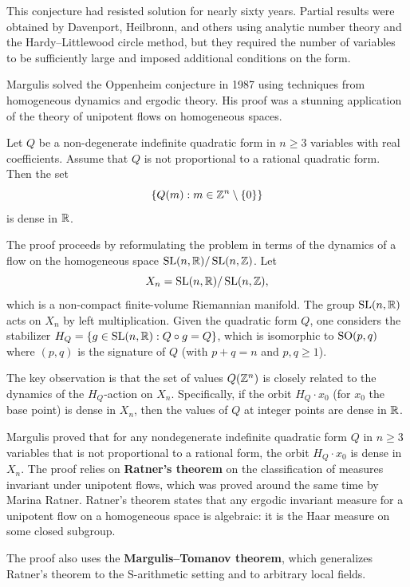 This conjecture had resisted solution for nearly sixty years. Partial results were obtained by Davenport, Heilbronn, and others using analytic number theory and the Hardy--Littlewood circle method, but they required the number of variables to be sufficiently large and imposed additional conditions on the form.

Margulis solved the Oppenheim conjecture in 1987 using techniques from homogeneous dynamics and ergodic theory. His proof was a stunning application of the theory of unipotent flows on homogeneous spaces.

\begin{theorem}
Let \(Q\) be a non-degenerate indefinite quadratic form in \(n \geq 3\) variables with real coefficients. Assume that \(Q\) is not proportional to a rational quadratic form. Then the set
\[
\{Q(m) : m \in \mathbb{Z}^n \setminus \{0\}\}
\]
is dense in \(\mathbb{R}\).
\end{theorem}

The proof proceeds by reformulating the problem in terms of the dynamics of a flow on the homogeneous space \(\operatorname{SL}(n,\mathbb{R})/\operatorname{SL}(n,\mathbb{Z})\). Let
\[
X_n = \operatorname{SL}(n,\mathbb{R})/\operatorname{SL}(n,\mathbb{Z}),
\]
which is a non-compact finite-volume Riemannian manifold. The group \(\operatorname{SL}(n,\mathbb{R})\) acts on \(X_n\) by left multiplication. Given the quadratic form \(Q\), one considers the stabilizer \(H_Q = \{g \in \operatorname{SL}(n,\mathbb{R}) : Q \circ g = Q\}\), which is isomorphic to \(\operatorname{SO}(p,q)\) where \((p,q)\) is the signature of \(Q\) (with \(p+q = n\) and \(p,q \geq 1\)).

The key observation is that the set of values \(Q(\mathbb{Z}^n)\) is closely related to the dynamics of the \(H_Q\)-action on \(X_n\). Specifically, if the orbit \(H_Q \cdot x_0\) (for \(x_0\) the base point) is dense in \(X_n\), then the values of \(Q\) at integer points are dense in \(\mathbb{R}\).

Margulis proved that for any nondegenerate indefinite quadratic form \(Q\) in \(n \geq 3\) variables that is not proportional to a rational form, the orbit \(H_Q \cdot x_0\) is dense in \(X_n\). The proof relies on \textbf{Ratner's theorem} on the classification of measures invariant under unipotent flows, which was proved around the same time by Marina Ratner. Ratner's theorem states that any ergodic invariant measure for a unipotent flow on a homogeneous space is algebraic: it is the Haar measure on some closed subgroup.

The proof also uses the \textbf{Margulis--Tomanov theorem}, which generalizes Ratner's theorem to the S-arithmetic setting and to arbitrary local fields.

